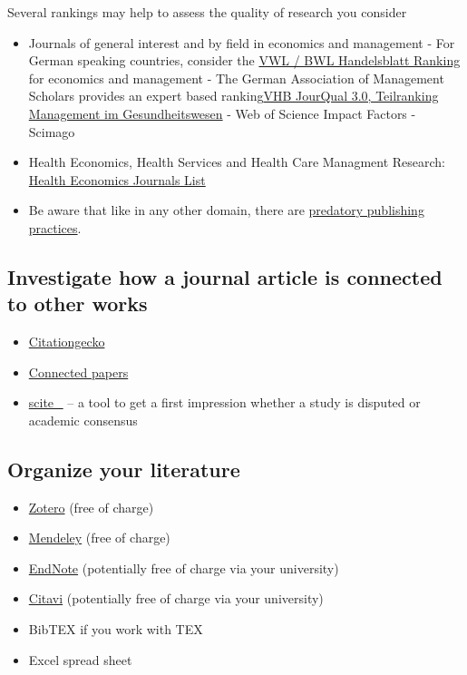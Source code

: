 \documentclass[
]{book}
\providecommand{\tightlist}{%
  \setlength{\itemsep}{0pt}\setlength{\parskip}{0pt}}
\begin{document}
Several rankings may help to assess the quality of research you consider

\begin{itemize}
\tightlist
\item
  Journals of general interest and by field in economics and management
  - For German speaking countries, consider the
  \href{https://www.forschungsmonitoring.org/}{VWL / BWL Handelsblatt
  Ranking} for economics and management - The German Association of
  Management Scholars provides an expert based
  ranking\href{https://vhbonline.org/vhb4you/vhb-jourqual/vhb-jourqual-3/tabellen-zum-download}{VHB
  JourQual 3.0, Teilranking Management im Gesundheitswesen} - Web of
  Science Impact Factors - Scimago
\item
  Health Economics, Health Services and Health Care Managment Research:
  \href{https://www.mthooddiabeteschallenge.com/journal-list}{Health
  Economics Journals List}
\item
  Be aware that like in any other domain, there are
  \href{https://predatoryjournals.com/}{predatory publishing practices}.
\end{itemize}

\hypertarget{investigate-how-a-journal-article-is-connected-to-other-works}{%
\subsection{Investigate how a journal article is connected to other
works}\label{investigate-how-a-journal-article-is-connected-to-other-works}}

\begin{itemize}
\tightlist
\item
  \href{https://citationgecko.azurewebsites.net/}{Citationgecko}
\item
  \href{https://www.connectedpapers.com}{Connected papers}
\item
  \href{https://scite.ai/}{scite\_} -- a tool to get a first impression
  whether a study is disputed or academic consensus
\end{itemize}

\hypertarget{organize-your-literature}{%
\subsection{Organize your literature}\label{organize-your-literature}}

\begin{itemize}
\tightlist
\item
  \href{https://www.zotero.org/}{Zotero} (free of charge)
\item
  \href{https://www.mendeley.com/guides/desktop}{Mendeley} (free of
  charge)
\item
  \href{https://endnote.com/}{EndNote} (potentially free of charge via
  your university)
\item
  \href{https://www.citavi.com/de}{Citavi} (potentially free of charge
  via your university)
\item
  BibTEX if you work with TEX
\item
  Excel spread sheet 
\end{itemize}
\end{document}

